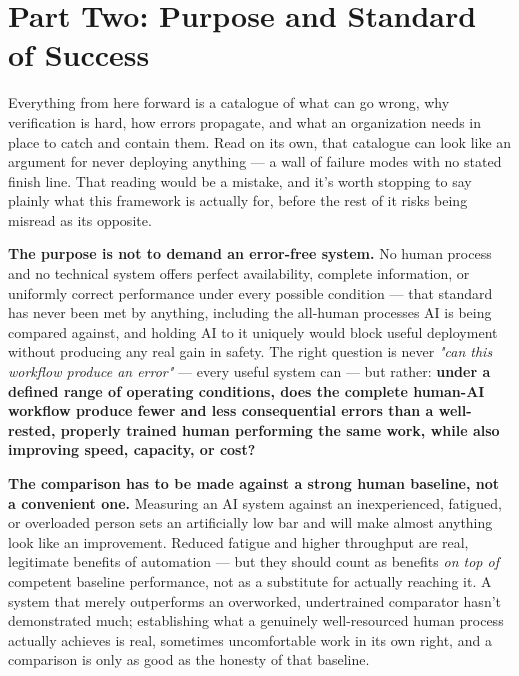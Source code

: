 \section{Part Two: Purpose and Standard of Success}

Everything from here forward is a catalogue of what can go wrong, why verification is hard, how errors propagate, and what an organization needs in place to catch and contain them. Read on its own, that catalogue can look like an argument for never deploying anything --- a wall of failure modes with no stated finish line. That reading would be a mistake, and it's worth stopping to say plainly what this framework is actually for, before the rest of it risks being misread as its opposite.

\textbf{The purpose is not to demand an error-free system.} No human process and no technical system offers perfect availability, complete information, or uniformly correct performance under every possible condition --- that standard has never been met by anything, including the all-human processes AI is being compared against, and holding AI to it uniquely would block useful deployment without producing any real gain in safety. The right question is never \emph{"can this workflow produce an error"} --- every useful system can --- but rather: \textbf{under a defined range of operating conditions, does the complete human-AI workflow produce fewer and less consequential errors than a well-rested, properly trained human performing the same work, while also improving speed, capacity, or cost?}

\textbf{The comparison has to be made against a strong human baseline, not a convenient one.} Measuring an AI system against an inexperienced, fatigued, or overloaded person sets an artificially low bar and will make almost anything look like an improvement. Reduced fatigue and higher throughput are real, legitimate benefits of automation --- but they should count as benefits \emph{on top of} competent baseline performance, not as a substitute for actually reaching it. A system that merely outperforms an overworked, undertrained comparator hasn't demonstrated much; establishing what a genuinely well-resourced human process actually achieves is real, sometimes uncomfortable work in its own right, and a comparison is only as good as the honesty of that baseline.

